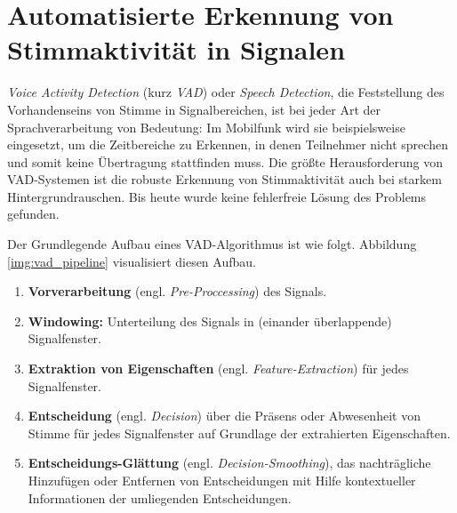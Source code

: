\section{Automatisierte Erkennung von Stimmaktivität in Signalen}
\label{sec:vad_new}

\emph{Voice Activity Detection} (kurz \emph{VAD}) oder \emph{Speech Detection}, die Feststellung des Vorhandenseins von Stimme in Signalbereichen, ist bei jeder Art der Sprachverarbeitung von Bedeutung: Im Mobilfunk wird sie beispielsweise eingesetzt, um die Zeitbereiche zu Erkennen, in denen Teilnehmer nicht sprechen und somit keine Übertragung stattfinden muss. Die größte Herausforderung von VAD-Systemen ist die robuste Erkennung von Stimmaktivität auch bei starkem Hintergrundrauschen. Bis heute wurde keine fehlerfreie Lösung des Problems gefunden. \cite[S. 1]{vad_granada} \cite[S. 1]{vad_kola} \cite[S. 1]{vad_Lisboa}

Der Grundlegende Aufbau eines VAD-Algorithmus ist wie folgt. Abbildung \ref{img:vad_pipeline} visualisiert diesen Aufbau.
\begin{enumerate}
	\item \textbf{Vorverarbeitung} (engl. \emph{Pre-Proccessing}) des Signals.
	\item \textbf{Windowing: } Unterteilung des Signals in (einander überlappende) Signalfenster.
	\item \textbf{Extraktion von Eigenschaften} (engl. \emph{Feature-Extraction}) für jedes Signalfenster.
	\item \textbf{Entscheidung} (engl. \emph{Decision}) über die Präsens oder Abwesenheit von Stimme für jedes Signalfenster auf Grundlage der extrahierten Eigenschaften.
	\item \textbf{Entscheidungs-Glättung} (engl. \emph{Decision-Smoothing}), das nachträgliche Hinzufügen oder Entfernen von Entscheidungen mit Hilfe kontextueller Informationen der umliegenden Entscheidungen.\cite[S. 8 - 9]{vad_granada} \cite[S. 1 - 2]{vad_kola}
\end{enumerate}

